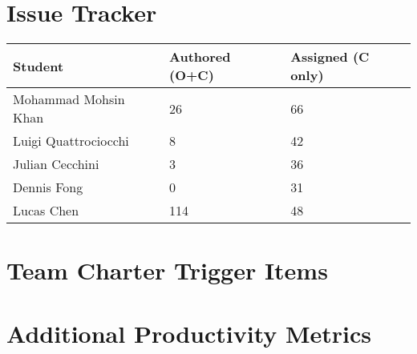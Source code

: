 \documentclass{article}
\begin{document}
\section{Issue Tracker}


\begin{table}[H]
\centering
\begin{tabular}{lll}
\toprule
\textbf{Student} & \textbf{Authored (O+C)} & \textbf{Assigned (C only)}\\
\midrule
Mohammad Mohsin Khan & 26 & 66 \\
Luigi Quattrociocchi & 8 & 42 \\
Julian Cecchini & 3 & 36 \\
Dennis Fong & 0 & 31 \\
Lucas Chen & 114 & 48 \\
\bottomrule
\end{tabular}
\end{table}


\section{Team Charter Trigger Items}




\section{Additional Productivity Metrics}

\end{document}
